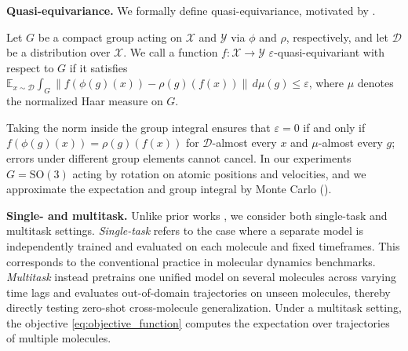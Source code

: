 {
\textbf{Quasi-equivariance.}
\label{def:quasi_equivariance}
We formally define quasi-equivariance, motivated by \cite{elhag_relaxed_2025}.
\begin{definition}
Let $G$ be a compact group acting on $\mathcal{X}$ and $\mathcal{Y}$ via $\phi$ and $\rho$, respectively, and let $\mathcal{D}$ be a distribution over $\mathcal{X}$. We call a function $f: \mathcal{X} \rightarrow \mathcal{Y}$ $\varepsilon$-quasi-equivariant with respect to $G$ if it satisfies $\mathbb E_{x \sim \mathcal{D}} \int_G \big\| f( \phi(g)(x) ) - \rho(g) (f(x)) \big\| \, d\mu(g) \leq \varepsilon$,
where $\mu$ denotes the normalized Haar measure on $G$.
\end{definition}
Taking the norm inside the group integral ensures that $\varepsilon = 0$ if and only if $f(\phi(g)(x)) = \rho(g)(f(x))$ for $\mathcal{D}$-almost every $x$ and $\mu$-almost every $g$; errors under different group elements cannot cancel. In our experiments $G = \mathrm{SO}(3)$ acting by rotation on atomic positions and velocities, and we approximate the expectation and group integral by Monte Carlo ().
}

\textbf{Single- and multitask.}
\label{sec:st_and_mt}
Unlike prior works \cite{schreiner_implicit_2023, xu_equivariant_2024}, we consider both single-task and multitask settings. \textit{Single-task} refers to the case where a separate model is independently trained and evaluated on each molecule and fixed timeframes. This corresponds to the conventional practice in molecular dynamics benchmarks. \textit{Multitask} instead pretrains one unified model on several molecules across varying time lags and evaluates out-of-domain trajectories on unseen molecules, thereby directly testing zero-shot cross-molecule generalization. Under a multitask setting, the objective \eqref{eq:objective_function} computes the expectation over trajectories of multiple molecules. 





